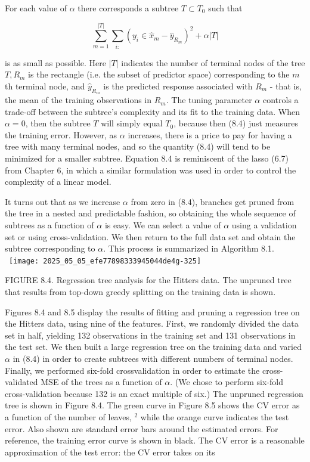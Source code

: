 \documentclass[10pt]{article}
\begin{document}
For each value of $\alpha$ there corresponds a subtree $T \subset T_{0}$ such that


\begin{equation*}
\sum_{m=1}^{|T|} \sum_{i:}\left(y_{i} \in \hat{x}_{m}-\hat{y}_{R_{m}}\right)^{2}+\alpha|T| \tag{8.4}
\end{equation*}


is as small as possible. Here $|T|$ indicates the number of terminal nodes of the tree $T, R_{m}$ is the rectangle (i.e. the subset of predictor space) corresponding to the $m$ th terminal node, and $\hat{y}_{R_{m}}$ is the predicted response associated with $R_{m}$ - that is, the mean of the training observations in $R_{m}$. The tuning parameter $\alpha$ controls a trade-off between the subtree's complexity and its fit to the training data. When $\alpha=0$, then the subtree $T$ will simply equal $T_{0}$, because then (8.4) just measures the training error. However, as $\alpha$ increases, there is a price to pay for having a tree with many terminal nodes, and so the quantity (8.4) will tend to be minimized for a smaller subtree. Equation 8.4 is reminiscent of the lasso (6.7) from Chapter 6, in which a similar formulation was used in order to control the complexity of a linear model.

It turns out that as we increase $\alpha$ from zero in (8.4), branches get pruned from the tree in a nested and predictable fashion, so obtaining the whole sequence of subtrees as a function of $\alpha$ is easy. We can select a value of $\alpha$ using a validation set or using cross-validation. We then return to the full data set and obtain the subtree corresponding to $\alpha$. This process is summarized in Algorithm 8.1.\
\
\texttt{[image: 2025\_05\_05\_efe77898333945044de4g-325]}

FIGURE 8.4. Regression tree analysis for the Hitters data. The unpruned tree that results from top-down greedy splitting on the training data is shown.

Figures 8.4 and 8.5 display the results of fitting and pruning a regression tree on the Hitters data, using nine of the features. First, we randomly divided the data set in half, yielding 132 observations in the training set and 131 observations in the test set. We then built a large regression tree on the training data and varied $\alpha$ in (8.4) in order to create subtrees with different numbers of terminal nodes. Finally, we performed six-fold crossvalidation in order to estimate the cross-validated MSE of the trees as a function of $\alpha$. (We chose to perform six-fold cross-validation because 132 is an exact multiple of six.) The unpruned regression tree is shown in Figure 8.4. The green curve in Figure 8.5 shows the CV error as a function of the number of leaves, ${ }^{2}$ while the orange curve indicates the test error. Also shown are standard error bars around the estimated errors. For reference, the training error curve is shown in black. The CV error is a reasonable approximation of the test error: the CV error takes on its
\end{document}
